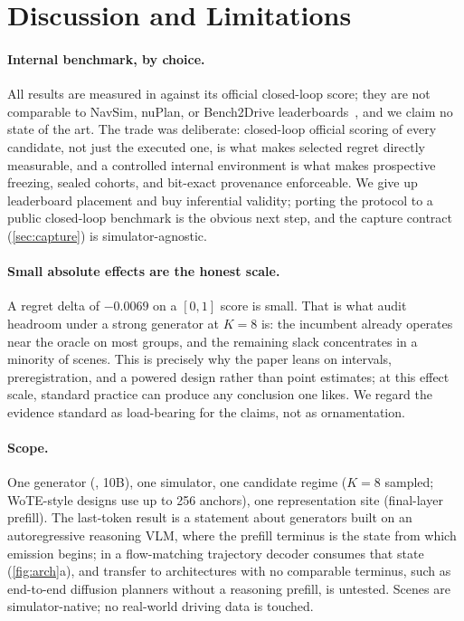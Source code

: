 \section{Discussion and Limitations}
\label{sec:discussion}

\paragraph{Internal benchmark, by choice.}
All results are measured in \simname{} against its official closed-loop score; they are not comparable to NavSim, nuPlan, or Bench2Drive leaderboards~\cite{dauner2024navsim,caesar2021nuplan,jia2024bench2drive}, and we claim no state of the art.
The trade was deliberate: closed-loop official scoring of every candidate, not just the executed one, is what makes selected regret directly measurable, and a controlled internal environment is what makes prospective freezing, sealed cohorts, and bit-exact provenance enforceable.
We give up leaderboard placement and buy inferential validity; porting the protocol to a public closed-loop benchmark is the obvious next step, and the capture contract (\cref{sec:capture}) is simulator-agnostic.

\paragraph{Small absolute effects are the honest scale.}
A regret delta of $-0.0069$ on a $[0,1]$ score is small.
That is what audit headroom under a strong generator at $K{=}8$ is: the incumbent already operates near the oracle on most groups, and the remaining slack concentrates in a minority of scenes.
This is precisely why the paper leans on intervals, preregistration, and a powered design rather than point estimates; at this effect scale, standard practice can produce any conclusion one likes.
We regard the evidence standard as load-bearing for the claims, not as ornamentation.

\paragraph{Scope.}
One generator (\vlaname, 10B), one simulator, one candidate regime ($K{=}8$ sampled; WoTE-style designs use up to 256 anchors), one representation site (final-layer prefill).
The last-token result is a statement about generators built on an autoregressive reasoning VLM, where the prefill terminus is the state from which emission begins; in \vlaname{} a flow-matching trajectory decoder consumes that state (\cref{fig:arch}a), and transfer to architectures with no comparable terminus, such as end-to-end diffusion planners without a reasoning prefill, is untested.
Scenes are simulator-native; no real-world driving data is touched.

